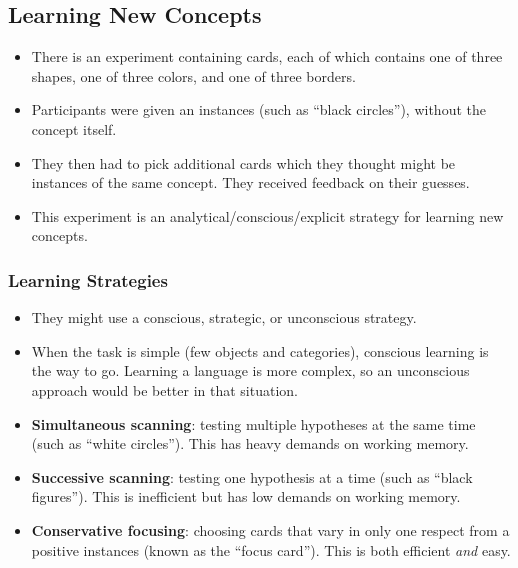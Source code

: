 \documentclass[]{article}
\begin{document}
		\subsection{Learning New Concepts}
			\begin{itemize}
				\item There is an experiment containing cards, each of which contains one of three shapes, one of three colors, and one of three borders.
				\item Participants were given an instances (such as ``black circles''), without the concept itself.
				\item They then had to pick additional cards which they thought might be instances of the same concept. They received feedback on their guesses.
				\item This experiment is an analytical/conscious/explicit strategy for learning new concepts.
			\end{itemize}

			\subsubsection{Learning Strategies}
				\begin{itemize}
					\item They might use a conscious, strategic, or unconscious strategy.
					\item When the task is simple (few objects and categories), conscious learning is the way to go. Learning a language is more complex, so an unconscious approach would be better in that situation.
					\item \textbf{Simultaneous scanning}: testing multiple hypotheses at the same time (such as ``white circles''). This has heavy demands on working memory.
					\item \textbf{Successive scanning}: testing one hypothesis at a time (such as ``black figures''). This is inefficient but has low demands on working memory.
					\item \textbf{Conservative focusing}: choosing cards that vary in only one respect from a positive instances (known as the ``focus card''). This is both efficient \emph{and} easy.
				\end{itemize}
\end{document}

